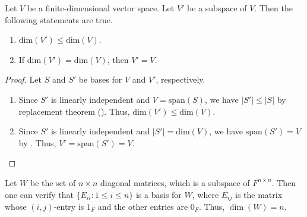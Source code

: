 \begin{proposition}\label{prop:subspace-dimension}
  Let $V$ be a finite-dimensional vector space.
  Let $V'$ be a subspace of $V$.
  Then the following statements are true.
  \begin{enumerate}
    \item $\mathrm{dim}(V') \leq \mathrm{dim}(V)$.
    \item If $\mathrm{dim}(V') = \mathrm{dim}(V)$, then $V' = V$.
  \end{enumerate}
\end{proposition}
\begin{proof}
  Let $S$ and $S'$ be bases for $V$ and $V'$, respectively.
  \begin{enumerate}
    \item Since $S'$ is linearly independent and $V = \mathrm{span}(S)$,
      we have $|S'| \leq |S|$ by replacement theorem ().
      Thus, $\mathrm{dim}(V') \leq \mathrm{dim}(V)$.
    \item Since $S'$ is linearly independent and $|S'| = \mathrm{dim}(V)$,
      we have $\mathrm{span}(S') = V$ by .
      Thus, $V' = \mathrm{span}(S') = V$. \qedhere
  \end{enumerate}
\end{proof}

\begin{example}
  Let $W$ be the set of $n \times n$ diagonal matrices, which is a subspace of
  $F^{n \times n}$.
  Then one can verify that $\{E_{ii}: 1 \leq i \leq n\}$ is a basis for $W$,
  where $E_{ij}$ is the matrix whose $(i, j)$-entry is $1_F$ and the other
  entries are $0_F$.
  Thus, $\dim(W) = n$.
\end{example}